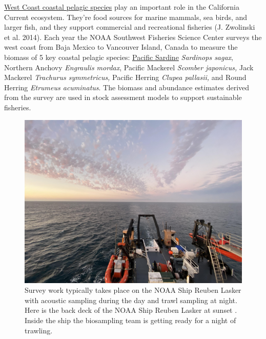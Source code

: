 \documentclass[
  letterpaper,
  oneside,
  open=any]{scrbook}
\begin{document}
\href{https://www.fisheries.noaa.gov/species/west-coast-coastal-pelagic-species}{West
Coast coastal pelagic species} play an important role in the California
Current ecosystem. They're food sources for marine mammals, sea birds,
and larger fish, and they support commercial and recreational fisheries
(J. Zwolinski et al. 2014). Each year the NOAA Southwest Fisheries
Science Center surveys the west coast from Baja Mexico to Vancouver
Island, Canada to measure the biomass of 5 key coastal pelagic species:
\href{https://www.fisheries.noaa.gov/species/pacific-sardine\#:~:text=Baja\%20California\%2C\%20Mexico.-,Habitat,schools\%20near\%20the\%20ocean\%20surface.}{Pacific
Sardine} \emph{Sardinops sagax}, Northern Anchovy \emph{Engraulis
mordax}, Pacific Mackerel \emph{Scomber japonicus,} Jack Mackerel
\emph{Trachurus symmetricus,} Pacific Herring \emph{Clupea pallasii,}
and Round Herring \emph{Etrumeus acuminatus}. The biomass and abundance
estimates derived from the survey are used in stock assessment models to
support sustainable fisheries.

\begin{figure}[H]

{\centering \includegraphics[width=8.20833in,height=\textheight]{content/images/lasker-sunset.jpg}

}

\caption{Survey work typically takes place on the NOAA Ship Reuben
Lasker with acoustic sampling during the day and trawl sampling at
night. Here is the back deck of the NOAA Ship Reuben Lasker at sunset .
Inside the ship the biosampling team is getting ready for a night of
trawling.}

\end{figure}%
\end{document}
